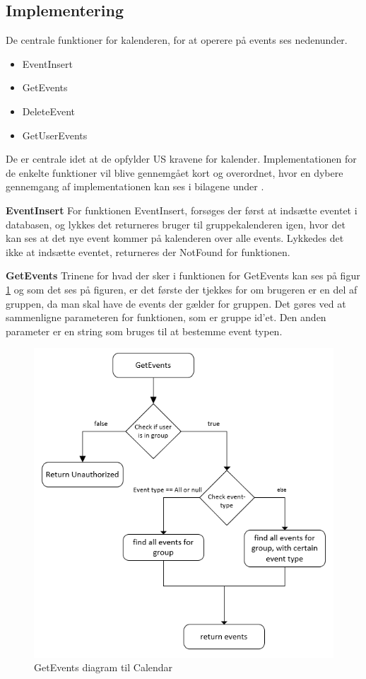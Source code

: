 \subsection{Implementering}

De centrale funktioner for kalenderen, for at operere på events ses nedenunder.

\begin{itemize}
    \item EventInsert
    \item GetEvents
    \item DeleteEvent
    \item GetUserEvents
\end{itemize}

De er centrale idet at de opfylder US kravene for kalender. Implementationen for de enkelte funktioner vil blive gennemgået kort og overordnet, hvor en dybere gennemgang af implementationen kan ses i bilagene under \cite{DesignOgImplementationCalendar}. 

\textbf{EventInsert}
\newline
\noindent 
For funktionen EventInsert, forsøges der først at indsætte eventet i databasen, og lykkes det returneres bruger til gruppekalenderen igen, hvor det kan ses at det nye event kommer på kalenderen over alle events. Lykkedes det ikke at indsætte eventet, returneres der NotFound for funktionen.

\textbf{GetEvents} 
\newline
\noindent 
Trinene for hvad der sker i funktionen for GetEvents kan ses på figur \ref{fig:GetEventsDiagram} og som det ses på figuren, er det første der tjekkes for om brugeren er en del af gruppen, da man skal have de events der gælder for gruppen. Det gøres ved at sammenligne parameteren for funktionen, som er gruppe id'et. Den anden parameter er en string som bruges til at bestemme event typen. 

\begin{figure}[H]
    \centering
    \includegraphics[width=0.8\linewidth]{10_Design_og_implementering/Calendar/Images/GetEvents.PNG}
    \caption{GetEvents diagram til Calendar}
    \label{fig:GetEventsDiagram}
\end{figure}{}

